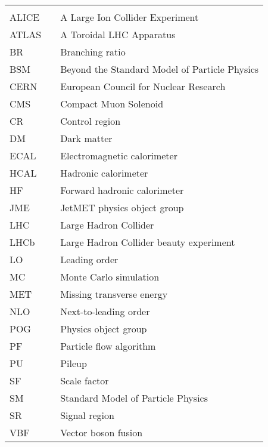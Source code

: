 \begin{center}
  \begin{tabular}{lll}
    \hspace*{2em} & \hspace*{1in} & \hspace*{4.5in} \\
    ALICE & \dotfill & A Large Ion Collider Experiment \\
    ATLAS & \dotfill & A Toroidal LHC Apparatus \\
    BR   & \dotfill & Branching ratio \\
    BSM  & \dotfill & Beyond the Standard Model of Particle Physics \\
    CERN & \dotfill & European Council for Nuclear Research \\
    CMS  & \dotfill & Compact Muon Solenoid \\
    CR   & \dotfill & Control region \\
    DM   & \dotfill & Dark matter \\
    ECAL & \dotfill & Electromagnetic calorimeter \\
    HCAL & \dotfill & Hadronic calorimeter \\
    HF   & \dotfill & Forward hadronic calorimeter \\
    JME  & \dotfill & JetMET physics object group \\
    LHC  & \dotfill & Large Hadron Collider \\
    LHCb & \dotfill & Large Hadron Collider beauty experiment \\
    LO   & \dotfill & Leading order \\
    MC   & \dotfill & Monte Carlo simulation \\
    MET  & \dotfill & Missing transverse energy \\
    NLO  & \dotfill & Next-to-leading order \\
    POG  & \dotfill & Physics object group \\
    PF   & \dotfill & Particle flow algorithm \\
    PU   & \dotfill & Pileup \\
    SF   & \dotfill & Scale factor \\
    SM   & \dotfill & Standard Model of Particle Physics \\
    SR   & \dotfill & Signal region \\
    VBF  & \dotfill & Vector boson fusion \\
  \end{tabular}
\end{center}
\cleardoublepage


\newpage
\endofprelim
